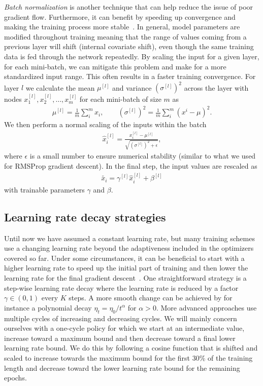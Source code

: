 \textit{Batch normalization} is another technique that can help reduce the issue of poor gradient flow. Furthermore, it can benefit by speeding up convergence and making the training process more stable~\cite{ioffe2015batch}. In general, model parameters are modified throughout training meaning that the range of values coming from a previous layer will shift (internal covariate shift), even though the same training data is fed through the network repeatedly. By scaling the input for a given layer, for each mini-batch, we can mitigate this problem and make for a more standardized input range. This often results in a faster training convergence. For layer $l$ we calculate the mean $\mu^{[l]}$ and variance $(\sigma^{[l]})^{2}$ across the layer with nodes $x_1^{[l]}, x_2^{[l]}, \ldots, x_m^{[l]}$ for each mini-batch of size $m$ as
\begin{align*}
  \mu^{[l]} = \frac{1}{m} \sum_i^m x_i, \qquad (\sigma^{[l]})^{2} = \frac{1}{m} \sum_i^m (x^i-\mu)^2.
\end{align*}
We then perform a normal scaling of the inputs within the batch
\begin{align*}
  \hat{x}_i^{[l]} = \frac{x_i^{[l]} - \mu^{[l]}}{\sqrt{(\sigma^{[l]})^{2} + \epsilon}},
\end{align*}
where $\epsilon$ is a small number to ensure numerical stability (similar to what we used for \acrshort{RMSProp} gradient descent). In the final step, the input values are rescaled as
\begin{align*}
  \tilde{x_i} = \gamma^{[l]} \hat{x}_i^{[l]} + \beta^{[l]}
\end{align*}
with trainable parameters $\gamma$ and $\beta$. 

\subsection{Learning rate decay strategies}
Until now we have assumed a constant learning rate, but many training schemes use a changing learning rate beyond the adaptiveness included in the optimizers covered so far. Under some circumstances, it can be beneficial to start with a higher learning rate to speed up the initial part of training and then lower the learning rate for the final gradient descent~\cite{smith2018disciplined}. One straightforward strategy is a step-wise learning rate decay where the learning rate is reduced by a factor $\gamma \in (0,1)$ every $K$ steps. A more smooth change can be achieved by for instance a polynomial decay $\eta_t = \eta_0/t^{\alpha}$ for $\alpha > 0$. More advanced approaches use multiple cycles of increasing and decreasing cycles. We will mainly concern ourselves with a one-cycle policy for which we start at an
intermediate value, increase toward a maximum bound and then decrease toward a
final lower learning rate bound. We do this by following a cosine function that is shifted and scaled to increase towards the maximum bound for the first 30\% of the training length and decrease toward the lower learning rate bound for the remaining epochs. 


